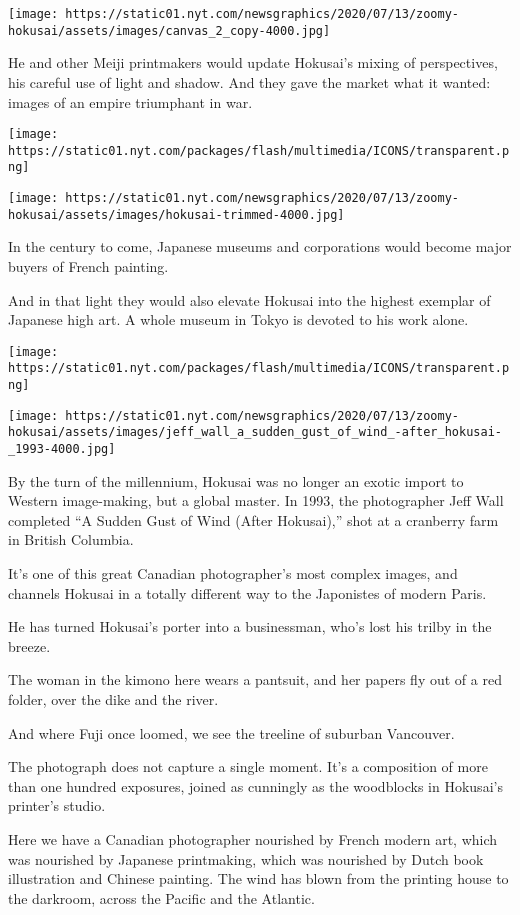 \texttt{[image: https://static01.nyt.com/newsgraphics/2020/07/13/zoomy-hokusai/assets/images/canvas\_2\_copy-4000.jpg]}

He and other Meiji printmakers would update Hokusai's mixing of
perspectives, his careful use of light and shadow. And they gave the
market what it wanted: images of an empire triumphant in war.

\texttt{[image: https://static01.nyt.com/packages/flash/multimedia/ICONS/transparent.png]}

\texttt{[image: https://static01.nyt.com/newsgraphics/2020/07/13/zoomy-hokusai/assets/images/hokusai-trimmed-4000.jpg]}

In the century to come, Japanese museums and corporations would become
major buyers of French painting.

And in that light they would also elevate Hokusai into the highest
exemplar of Japanese high art. A whole museum in Tokyo is devoted to his
work alone.

\texttt{[image: https://static01.nyt.com/packages/flash/multimedia/ICONS/transparent.png]}

\texttt{[image: https://static01.nyt.com/newsgraphics/2020/07/13/zoomy-hokusai/assets/images/jeff\_wall\_a\_sudden\_gust\_of\_wind\_-after\_hokusai-\_1993-4000.jpg]}

By the turn of the millennium, Hokusai was no longer an exotic import to
Western image-making, but a global master. In 1993, the photographer
Jeff Wall completed ``A Sudden Gust of Wind (After Hokusai),'' shot at a
cranberry farm in British Columbia.

It's one of this great Canadian photographer's most complex images, and
channels Hokusai in a totally different way to the Japonistes of modern
Paris.

He has turned Hokusai's porter into a businessman, who's lost his trilby
in the breeze.

The woman in the kimono here wears a pantsuit, and her papers fly out of
a red folder, over the dike and the river.

And where Fuji once loomed, we see the treeline of suburban Vancouver.

The photograph does not capture a single moment. It's a composition of
more than one hundred exposures, joined as cunningly as the woodblocks
in Hokusai's printer's studio.

Here we have a Canadian photographer nourished by French modern art,
which was nourished by Japanese printmaking, which was nourished by
Dutch book illustration and Chinese painting. The wind has blown from
the printing house to the darkroom, across the Pacific and the Atlantic.

